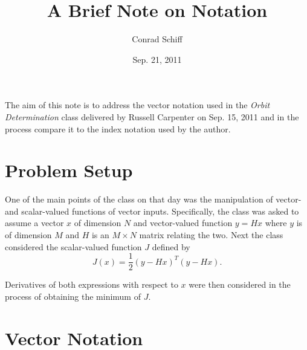 \documentclass[10pt]{article}
\begin{document}
\title{A Brief Note on Notation}
\author{Conrad Schiff}
\date{Sep. 21, 2011}
\maketitle

The aim of this note is to address the vector notation
used in the \emph{Orbit Determination} class delivered by
Russell Carpenter on Sep. 15, 2011 and in the process
compare it to the index notation used by the author.

\section{Problem Setup}
One of the main points of the class on that day was the 
manipulation of vector- and scalar-valued functions of vector 
inputs. Specifically,  the class was asked to assume a vector 
$x$ of dimension $N$ and vector-valued function $y = H x$ 
where $y$ is of dimension $M$ and $H$ is an $M \times N$ matrix 
relating the two.  Next the class considered the scalar-valued
function $J$ defined by 
\[
  J(x) = \frac{1}{2} ( y - H x ) ^T (y - H x) .
\]

Derivatives of both expressions with respect to $x$ were then 
considered in the process of obtaining the minimum of $J$.

\section{Vector Notation}
\end{document}

